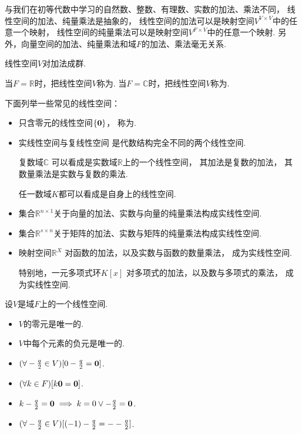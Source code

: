 \begin{remark}
与我们在初等代数中学习的自然数、整数、有理数、实数的加法、乘法不同，
线性空间的加法、纯量乘法是抽象的，
线性空间的加法可以是映射空间\(V^{V \times V}\)中的任意一个映射，
线性空间的纯量乘法可以是映射空间\(V^{F \times V}\)中的任意一个映射.
另外，向量空间的加法、纯量乘法和域\(F\)的加法、乘法毫无关系.
\end{remark}
\begin{remark}
线性空间\(V\)对加法成群.
\end{remark}

当\(F = \mathbb{R}\)时，把线性空间\(V\)称为.
当\(F = \mathbb{C}\)时，把线性空间\(V\)称为.

\begin{example}
下面列举一些常见的线性空间：\begin{itemize}
	\item 只含零元的线性空间\(\{\boldsymbol0\}\)，
	称为.

	\item 实线性空间与复线性空间
	是代数结构完全不同的两个线性空间.

	复数域\(\mathbb{C}\)
	可以看成是实数域\(\mathbb{R}\)上的一个线性空间，
	其加法是复数的加法，
	其数量乘法是实数与复数的乘法.

	任一数域\(K\)都可以看成是自身上的线性空间.

	\item 集合\(\mathbb{R}^{n \times 1}\)关于向量的加法、实数与向量的纯量乘法构成实线性空间.

	\item 集合\(\mathbb{R}^{s \times n}\)关于矩阵的加法、实数与矩阵的纯量乘法构成实线性空间.

	\item 映射空间\(\mathbb{R}^X\)
	对函数的加法，以及实数与函数的数量乘法，
	成为实线性空间.

	特别地，一元多项式环\(K[x]\)
	对多项式的加法，以及数与多项式的乘法，
	成为实线性空间.
\end{itemize}
\end{example}

\begin{property}
设\(V\)是域\(F\)上的一个线性空间.
\begin{itemize}
	\item \(V\)的零元是唯一的.
	\item \(V\)中每个元素的负元是唯一的.
	\item \((\forall-\frac{q}{2}\in V)[0-\frac{q}{2}=\boldsymbol0]\).
	\item \((\forall k\in F)[k\boldsymbol0=\boldsymbol0]\).
	\item \(k-\frac{q}{2}=\boldsymbol0 \implies k=0 \lor -\frac{q}{2}=\boldsymbol0\).
	\item \((\forall-\frac{q}{2}\in V)[(-1)-\frac{q}{2}=--\frac{q}{2}]\).
\end{itemize}
\end{property}

